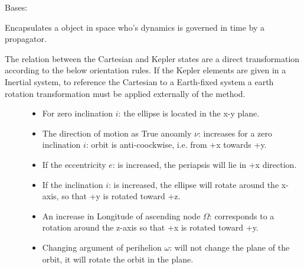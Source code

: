 \documentclass[letterpaper,10pt,english]{sphinxmanual}
\begin{document}
\begin{fulllineitems}
\label{\detokenize{modules/space_object:space_object.SpaceObject}}
Bases: 

Encapsulates a object in space who’s dynamics is governed in time by a propagator.

The relation between the Cartesian and Kepler states are a direct transformation according to the below orientation rules.
If the Kepler elements are given in a Inertial system, to reference the Cartesian to a Earth-fixed system a earth rotation transformation
must be applied externally of the method.
\begin{description}
\item[{}] \leavevmode\begin{itemize}
\item {} 
For zero inclination \(i\): the ellipse is located in the x-y plane.

\item {} 
The direction of motion as True anoamly \(\nu\): increases for a zero inclination \(i\): orbit is anti-coockwise, i.e. from +x towards +y.

\item {} 
If the eccentricity \(e\): is increased, the periapsis will lie in +x direction.

\item {} 
If the inclination \(i\): is increased, the ellipse will rotate around the x-axis, so that +y is rotated toward +z.

\item {} 
An increase in Longitude of ascending node \(\Omega\): corresponds to a rotation around the z-axis so that +x is rotated toward +y.

\item {} 
Changing argument of perihelion \(\omega\): will not change the plane of the orbit, it will rotate the orbit in the plane.


\end{itemize}
\end{description}
\end{fulllineitems}
\end{document}

